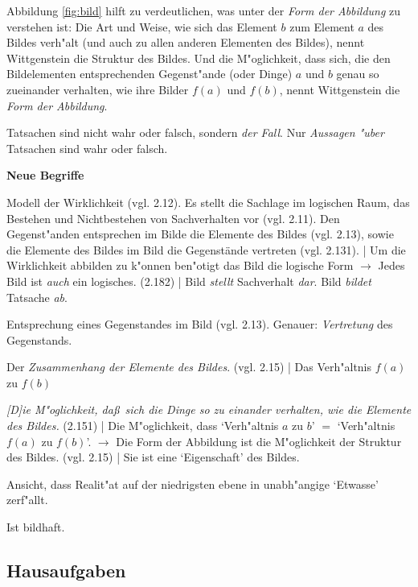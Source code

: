 \documentclass[emulatestandardclasses]{scrartcl}
\begin{document}
Abbildung \ref{fig:bild} hilft zu verdeutlichen, was unter der \emph{Form der Abbildung} zu verstehen ist: Die Art und Weise, wie sich das Element $b$ zum Element $a$ des Bildes verh"alt (und auch zu allen anderen Elementen des Bildes), nennt Wittgenstein die Struktur des Bildes. Und die M"oglichkeit, dass sich, die den Bildelementen entsprechenden Gegenst"ande (oder Dinge) $a$ und $b$ genau so zueinander verhalten, wie ihre Bilder $f(a)$ und $f(b)$, nennt Wittgenstein die \emph{Form der Abbildung}.

Tatsachen sind nicht wahr oder falsch, sondern \emph{der Fall}. Nur \emph{Aussagen "uber} Tatsachen sind wahr oder falsch.

\vspace{10pt}
\noindent \textbf{Neue Begriffe}

\begin{description}[leftmargin=!,labelwidth=\widthof{\bfseries Form der Abbildun}]
  \item[Bild] Modell der Wirklichkeit (vgl. 2.12). Es stellt die Sachlage im logischen Raum, das Bestehen und Nichtbestehen von Sachverhalten vor (vgl. 2.11). Den Gegenst"anden entsprechen im Bilde die Elemente des Bildes (vgl. 2.13), sowie die Elemente des Bildes im Bild die Gegenstände vertreten (vgl. 2.131). | Um die Wirklichkeit abbilden zu k"onnen ben"otigt das Bild die logische Form $\rightarrow$ Jedes Bild ist \emph{auch} ein logisches. (2.182) | Bild \emph{stellt} Sachverhalt \emph{dar}. Bild \emph{bildet} Tatsache \emph{ab}.
  \item[Element des Bildes] Entsprechung eines Gegenstandes im Bild (vgl. 2.13). Genauer: \emph{Vertretung} des Gegenstands.
  \item[Struktur des Bildes] Der \emph{Zusammenhang der Elemente des Bildes}. (vgl. 2.15) | Das Verh"altnis $f(a)$ zu $f(b)$
  \item[Form der Abbildung] \emph{[D]ie M"oglichkeit, da\ss~sich die Dinge so zu einander verhalten, wie die Elemente des Bildes.} (2.151) | Die M"oglichkeit, dass `Verh"altnis $a$ zu $b$' $=$ `Verh"altnis $f(a)$ zu $f(b)$'. $\rightarrow$ Die Form der Abbildung ist die M"oglichkeit der Struktur des Bildes. (vgl. 2.15) | Sie ist eine `Eigenschaft' des Bildes.
  \item[Log. Atomismus] Ansicht, dass Realit"at auf der niedrigsten ebene in unabh"angige `Etwasse' zerf"allt.
  \item[Sprache] Ist bildhaft.
\end{description}


\subsection{Hausaufgaben}
\end{document}
